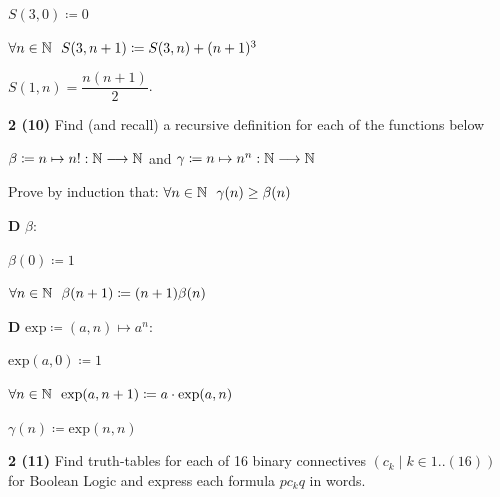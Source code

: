 \documentclass[11pt]{article}
\begin{document}
\vspace{6pt}
\bclabel
\hspace{1em}$S(3,0)\coloneqq0$

\rcslabel
\hspace{1em}$\forall n\in\mathbb{N}\ \ S(3,n+1)\coloneqq S(3,n)+(n+1)^3$

$S(1,n)=\dfrac{n(n+1)}{2}$.

\newpage

\newpage
{}
\noindent\textbf{2 (10)} \quad Find (and recall) a recursive definition for each of the functions below

\begin{center}
$\beta \coloneqq n \mapsto n! : \mathbb{N} \longrightarrow \mathbb{N}$ \quad and \quad
$\gamma \coloneqq n \mapsto n^n : \mathbb{N} \longrightarrow \mathbb{N}$
\end{center}

\noindent Prove by induction that: $\forall n \in \mathbb{N} \ \ \gamma(n) \geq \beta(n)$

\vspace{10pt}
\textbf{D} \quad $\beta$:

\bclabel
\hspace{1em}$\beta(0)\coloneqq1$

\rcslabel
\hspace{1em}$\forall n\in\N\ \ \beta(n+1)\coloneqq(n+1)\beta(n)$

\textbf{D} \quad $\mathrm{exp}\coloneqq(a,n)\mapsto a^n$:

\bclabel
\hspace{1em}$\mathrm{exp}(a,0)\coloneqq1$

\rcslabel
\hspace{1em}$\forall n\in\N\ \ \mathrm{exp}(a,n+1)\coloneqq a\cdot\mathrm{exp}(a,n)$

\hspace{1em}$\gamma(n)\coloneqq\mathrm{exp}(n,n)$

\vspace{4pt}
\newpage

\newpage
{}
\noindent\textbf{2 (11)} \quad Find truth-tables for each of 16 binary connectives $\left(c_k \mid k\in1..(16)\right)$ for Boolean Logic and express each formula $pc_kq$ in words.
\end{document}

